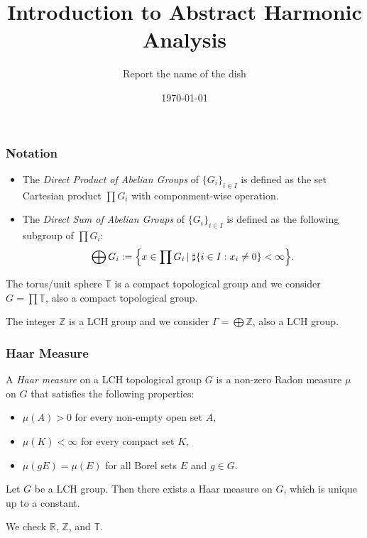 \documentclass{beamer}
\title{Introduction to Abstract Harmonic Analysis}
\author{Report the name of the dish}
\date{\today}
\def\T{\mathbb{T}}
\def\Z{\mathbb{Z}}
\def\R{\mathbb{R}}
\begin{document}
\begin{frame}
  \titlepage
\end{frame}

\begin{frame}
\frametitle{Notation}

\begin{itemize}
  \item The \emph{Direct Product of Abelian Groups} of $\{G_i\}_{i\in I}$ is defined as the set Cartesian product  $\prod G_i$ with componment-wise operation.
  \item The \emph{Direct Sum of Abelian Groups} of $\{G_i\}_{i\in I}$ is defined as the following subgroup of $\prod G_i$:
        \[\bigoplus G_i:=\Bigl\{x\in\prod G_i \left|\right. \sharp\{i\in I: x_i\ne0\}<\infty\Bigr\}.\]
\end{itemize} 

\begin{example}
    The torus/unit sphere $\mathbb{T}$ is a compact topological group and we consider $G=\prod \mathbb{T}$, also a compact topological group.
\end{example}

\begin{example}
    The integer $\mathbb{Z}$ is a LCH group and we consider $\Gamma=\bigoplus\mathbb{Z}$, also a LCH group.
\end{example}
\end{frame}

\begin{frame}%
\frametitle{Haar Measure}

\begin{definition}
A \emph{Haar measure} on a LCH topological group $G$ is a non-zero Radon measure $\mu$ on $G$ that satisfies the following properties:
\begin{itemize}
  \item $\mu(A) > 0$ for every non-empty open set $A$,
  \item $\mu(K) < \infty$ for every compact set $K$,
  \item $\mu(gE) = \mu(E)$ for all Borel sets $E$ and $g \in G$.
\end{itemize}
\end{definition}

\begin{Theorem}[Haar, 1933]
Let $G$ be a LCH group. Then there exists a Haar measure on $G$, which is unique up to a constant.
\cite*[Chapter~2]{folland2016course}
\end{Theorem}

\begin{example}
  We check $\R$, $\Z$, and $\T$.
\end{example}

\end{frame}
\end{document}
